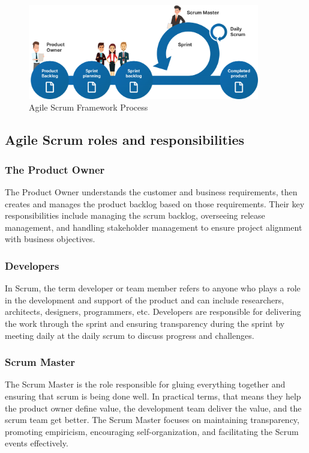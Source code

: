 \begin{figure}[ht!]
    \centering
    \includegraphics[width=0.9\textwidth]{images/agile.png}
    \caption{Agile Scrum Framework Process}
    \label{fig:agile-scrum}
\end{figure}

\subsection{Agile Scrum roles and responsibilities}

\subsubsection{The Product Owner}

The Product Owner understands the customer and business requirements, then creates and manages the product backlog based on those requirements. Their key responsibilities include managing the scrum backlog, overseeing release management, and handling stakeholder management to ensure project alignment with business objectives.

\subsubsection{Developers}

In Scrum, the term developer or team member refers to anyone who plays a role in the development and support of the product and can include researchers, architects, designers, programmers, etc. Developers are responsible for delivering the work through the sprint and ensuring transparency during the sprint by meeting daily at the daily scrum to discuss progress and challenges.

\subsubsection{Scrum Master}

The Scrum Master is the role responsible for gluing everything together and ensuring that scrum is being done well. In practical terms, that means they help the product owner define value, the development team deliver the value, and the scrum team get better. The Scrum Master focuses on maintaining transparency, promoting empiricism, encouraging self-organization, and facilitating the Scrum events effectively.

